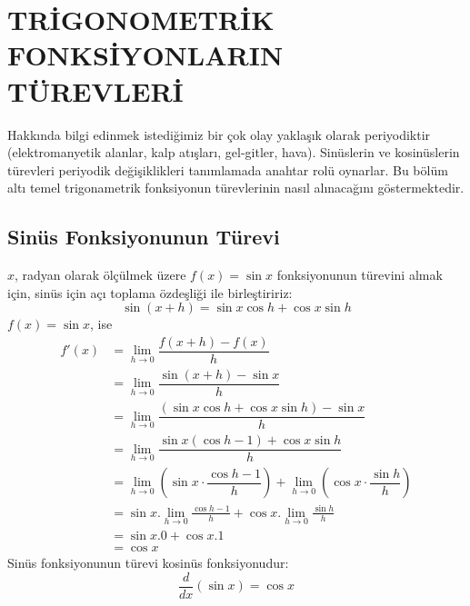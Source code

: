 \chapter{\protect TRİGONOMETRİK FONKSİYONLARIN TÜREVLERİ}
Hakkında bilgi edinmek istediğimiz bir çok olay yaklaşık olarak periyodiktir (elektromanyetik alanlar, kalp atışları, gel-gitler, hava). Sinüslerin ve kosinüslerin türevleri periyodik değişiklikleri tanımlamada anahtar rolü oynarlar. Bu bölüm altı temel trigonametrik fonksiyonun türevlerinin nasıl alınacağını göstermektedir.
\section{\protect Sinüs Fonksiyonunun Türevi} \label{bolumetiketi}
$x$, radyan olarak ölçülmek üzere $f(x) = \sin x$ fonksiyonunun türevini almak için, sinüs için açı toplama özdeşliği ile birleştiririz:
	\begin{equation*}
	\sin (x+h) = \sin x \cos h + \cos x \sin h
	\end{equation*}
$f(x) = \sin x$, ise
	\begin{equation*}
	\begin{split}
		f'(x)&=\lim _{h\rightarrow 0}\dfrac{f\left( x+h\right) -f\left( x\right) }{h}\\
		&=\lim _{h\rightarrow 0}\dfrac{\sin \left( x+h\right) -\sin x}{h}\\
		&=\lim _{h\rightarrow 0}\dfrac{\left( \sin x \cos h +\cos x\sin h \right) -\sin x}{h}\\
		&=\lim _{h\rightarrow 0}\dfrac{\sin x\left( \cos h -1\right) +\cos x\sin h }{h}\\
		&=\lim _{h\rightarrow 0}\left( \sin x\cdot \dfrac{\cos h -1}{h}\right) +\lim _{h\rightarrow 0}\left( \cos x\cdot \dfrac{\sin h }{h}\right)\\
		&=\sin x . \lim_{h \rightarrow 0} \frac{\cos h -1}{h}+\cos x . \lim_{h \rightarrow 0} \frac{\sin h}{h}\\
		&=\sin x . 0 + \cos x . 1\\
		&=\cos x
	\end{split}
	\end{equation*}
Sinüs fonksiyonunun türevi kosinüs fonksiyonudur:
	\begin{equation*}
	\frac{d}{dx}(\sin x) = \cos x
	\end{equation*}
